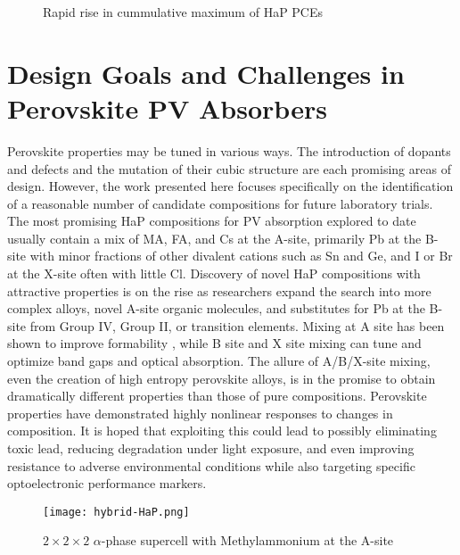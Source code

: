  
\begin{figure}[htbp]
\centering

\caption{\label{fig:nrel} Rapid rise in cummulative maximum of HaP PCEs}
\end{figure}

\section{Design Goals and Challenges in Perovskite PV Absorbers}
\label{sec:org13d5949}
Perovskite properties may be tuned in various ways.
The introduction of dopants and defects \autocite{kim-2020-upper-limit,dahliah-2021-high-throug} and the mutation of their cubic structure \autocite{kar-2018-comput-screen,kim-2017-hybrid-organ} are each promising areas of design.
However, the work presented here focuses specifically on the identification of a reasonable number of candidate compositions for future laboratory trials.
The most promising HaP compositions for PV absorption explored to date usually contain a mix of MA, FA, and Cs at the A-site, primarily Pb at the B-site with minor fractions of other divalent cations such as Sn and Ge, and I or Br at the X-site often with little Cl.
Discovery of novel HaP compositions with attractive properties is on the rise as researchers expand the search into more complex alloys, novel A-site organic molecules, and substitutes for Pb at the B-site from Group IV, Group II, or transition elements.
\autocite{zhu-2019-struc-elect,banerjee-2019-rashb-trigg,ding-2019-cesium-decreas,greenland-2020-correl-phase}
Mixing at A site has been shown to improve formability \autocite{zhang-2019-perov-photov}, while B site and X site mixing can tune and optimize band gaps and optical absorption.
The allure of A/B/X-site mixing, even the creation of high entropy perovskite alloys, is in the promise to obtain dramatically different properties than those of pure compositions.
Perovskite properties have demonstrated highly nonlinear responses to changes in composition.
It is hoped that exploiting this could lead to possibly eliminating toxic lead, reducing degradation under light exposure, and even improving resistance to adverse environmental conditions while also targeting specific optoelectronic performance markers.

\begin{figure}[htbp]
\centering
\texttt{[image: hybrid-HaP.png]}
\caption{\(2\times{}2\times{}2\) \(\alpha\)-phase supercell with Methylammonium at the A-site}
\end{figure}

